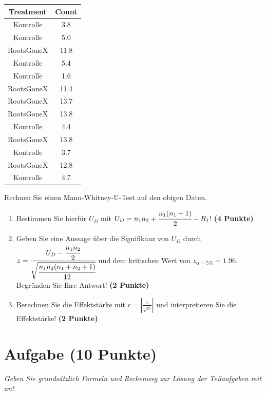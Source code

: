 \documentclass[a4paper, 9pt]{scrartcl}\usepackage[]{graphicx}\usepackage[]{xcolor}
\newenvironment{knitrout}{}{} %
\begin{document}
\begin{knitrout}
\color{fgcolor}\begin{table}[!h]
\centering
\begin{tabular}{cc}
\toprule
Treatment & Count\\
\midrule
Kontrolle & 3.8\\
Kontrolle & 5.0\\
RootsGoneX & 11.8\\
Kontrolle & 5.4\\
Kontrolle & 1.6\\
\addlinespace
RootsGoneX & 11.4\\
RootsGoneX & 13.7\\
RootsGoneX & 13.8\\
Kontrolle & 4.4\\
RootsGoneX & 13.8\\
\addlinespace
Kontrolle & 3.7\\
RootsGoneX & 12.8\\
Kontrolle & 4.7\\
\bottomrule
\end{tabular}
\end{table}

\end{knitrout}

Rechnen Sie einen Mann-Whitney-U-Test auf den obigen Daten.

\begin{enumerate}
\item Bestimmen Sie hierf{\"u}r $U_D$ mit $U_D = n_1n_2 +
  \cfrac{n_1(n_1+1)}{2}-R_1$! \textbf{(4 Punkte)} 
\item Geben Sie eine Aussage {\"u}ber die Signifikanz von $U_D$ durch
  $z = \cfrac{U_D -
    \cfrac{n_1n_2}{2}}{\sqrt{\cfrac{n_1n_2(n_1+n_2+1)}{12}}}$ und dem
  kritischen Wert von $z_{\alpha = 5\%} = 1.96$. Begr{\"u}nden Sie Ihre
  Antwort! \textbf{(2 Punkte)}
\item Berechnen Sie die Effektst{\"a}rke mit $r = |\frac{z}{\sqrt{n}}| $ und
  interpretieren Sie die Effektst{\"a}rke! \textbf{(2 Punkte)} 
\end{enumerate} 
\clearpage

\section{Aufgabe \hfill (10 Punkte)}

\textit{Geben Sie grunds{\"a}tzlich Formeln und Rechenweg zur L{\"o}sung der
  Teilaufgaben mit an!} \\[1Ex]
\end{document}
